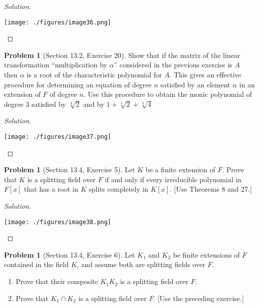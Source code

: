 \documentclass{amsart}
\numberwithin{equation}{section}
\theoremstyle{definition}
\newtheorem{problem}[thm]{Problem}
\begin{document}
\begin{proof}[Solution]\
\begin{center}
  \texttt{[image: ./figures/image36.png]}
\end{center}
\end{proof}


\begin{problem}[Section 13.2, Exercise 20]
Show that if the matrix of the linear transformation ``multiplication by \(\alpha\)'' considered in the previous exercise is \(A\) then \(\alpha\) is a root of the characteristic polynomial for \(A\). This gives an effective procedure for determining an equation of degree \(n\) satisfied by an element \(\alpha\) in an extension of \(F\) of degree \(n\). Use this procedure to obtain the monic polynomial of degree 3 satisfied by \(\sqrt[3]{2}\) and by \(1+\sqrt[3]{2}+\sqrt[3]{4}\)
\end{problem}

\begin{proof}[Solution]\
\begin{center}
  \texttt{[image: ./figures/image37.png]}
\end{center}
\end{proof}




\begin{problem}[Section 13.4, Exercise 5]
  Let \(K\) be a finite extension of \(F\). Prove that \(K\) is a
  splitting field over \(F\) if and only if every irreducible
  polynomial in \(F[x]\) that has a root in \(K\) splits completely in
  \(K[x]\). [Use Theorems 8 and 27.]
\end{problem}

\begin{proof}[Solution]\
\begin{center}
  \texttt{[image: ./figures/image38.png]}
\end{center}
\end{proof}



\begin{problem}[Section 13.4, Exercise 6]
Let \(K_1\) and \(K_2\) be finite extensions of \(F\) contained in the field \(K\), and assume both are splitting fields over \(F\).
\begin{enumerate}
\item Prove that their composite \(K_1 K_2\) is a splitting field over \(F\).
\item Prove that \(K_1 \cap K_2\) is a splitting field over \(F\). [Use the preceding exercise.]
\end{enumerate}
\end{problem}
\end{document}
